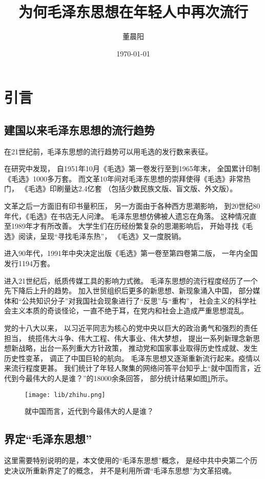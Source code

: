 \documentclass{ctexart}
\title{为何毛泽东思想在年轻人中再次流行}
\author{董晨阳}
\date{\today}
\begin{document}
\maketitle
\tableofcontents
\section{引言}
\subsection{建国以来毛泽东思想的流行趋势}
在21世纪前，毛泽东思想的流行趋势可以用毛选的发行数来表征。

\citeauthor{张慎趋2006毛泽东选集}在研究中发现，
自1951年10月《毛选》第一卷发行至到1965年末，
全国累计印制《毛选》1000多万套。
而文革10年间对毛泽东思想的崇拜使得《毛选》非常热门，
《毛选》印刷量达2.4亿套
（包括少数民族文版、盲文版、外文版）。


文革之后一方面旧有印书量积压，
另一方面由于各种西方思潮影响，
到20世纪80年代，《毛选》在书店无人问津。
毛泽东思想仿佛被人遗忘在角落。
这种情况直至1989年才有所改善。
大学生们在历经纷繁复杂的思潮影响后，
开始寻找《毛选》阅读，呈现“寻找毛泽东热”，
《毛选》又一度脱销。

进入90年代，1991年中央决定出版《毛选》第一卷至第四卷第二版，
一年内全国发行1194万套。

进入21世纪后，纸质传媒工具的影响力式微。
毛泽东思想的流行程度经历了一个先下降后上升的趋势。
加入世贸组织后更多的新思想、新现象涌入中国，
部分媒体和“公共知识分子”对我国社会现象进行了“反思”与“重构”，
社会主义的科学社会主义本质的奇谈怪论，一直不绝于耳，在党内和社会上造成严重思想混乱。

党的十八大以来，
以习近平同志为核心的党中央以巨大的政治勇气和强烈的责任担当，
统揽伟大斗争、伟大工程、伟大事业、伟大梦想，
提出一系列新理念新思想新战略，出台一系列重大方针政策，
推动党和国家事业取得历史性成就、发生历史性变革，
调正了中国巨轮的航向。
毛泽东思想又逐渐重新流行起来。疫情以来流行程度更甚。
我们统计了年轻人聚集的网络问答平台知乎上“就中国而言，近代到今最伟大的人是谁？”的18000余条回答，
部分统计结果如图\ref{zhihu}所示。

\begin{figure}
    \texttt{[image: lib/zhihu.png]}
    \caption{就中国而言，近代到今最伟大的人是谁？}
    \label{zhihu}
\end{figure}


\subsection{界定“毛泽东思想”}
这里需要特别说明的是，本文使用的“毛泽东思想”概念，
是经中共中央第二个历史决议所重新界定了的概念，
并不是利用所谓“毛泽东思想”为文革招魂。
\end{document}
